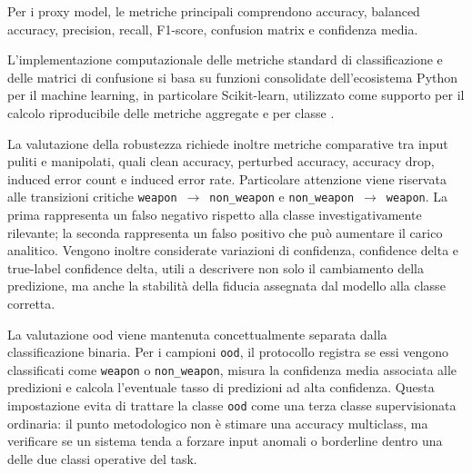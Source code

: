 Per i proxy model, le metriche principali comprendono accuracy, balanced
accuracy, precision, recall, F1-score, confusion matrix e confidenza media.

L'implementazione computazionale delle metriche standard di classificazione e
delle matrici di confusione si basa su funzioni consolidate dell'ecosistema
Python per il machine learning, in particolare Scikit-learn, utilizzato come
supporto per il calcolo riproducibile delle metriche aggregate e per classe
\cite{pedregosa2011scikit}.

La valutazione della robustezza richiede inoltre metriche comparative tra input
puliti e manipolati, quali clean accuracy, perturbed accuracy, accuracy drop,
induced error count e induced error rate. Particolare attenzione viene riservata
alle transizioni critiche \texttt{weapon}~$\rightarrow$~\texttt{non\_weapon} e
\texttt{non\_weapon}~$\rightarrow$~\texttt{weapon}. La prima rappresenta un
falso negativo rispetto alla classe investigativamente rilevante; la seconda
rappresenta un falso positivo che può aumentare il carico analitico. Vengono
inoltre considerate variazioni di confidenza, confidence delta e true-label
confidence delta, utili a descrivere non solo il cambiamento della predizione,
ma anche la stabilità della fiducia assegnata dal modello alla classe corretta.

La valutazione \gls{ood} viene mantenuta concettualmente separata dalla
classificazione binaria. Per i campioni \texttt{ood}, il protocollo registra se
essi vengono classificati come \texttt{weapon} o \texttt{non\_weapon}, misura la
confidenza media associata alle predizioni e calcola l'eventuale tasso di
predizioni ad alta confidenza. Questa impostazione evita di trattare la classe
\texttt{ood} come una terza classe supervisionata ordinaria: il punto
metodologico non è stimare una accuracy multiclass, ma verificare se un sistema
tenda a forzare input anomali o borderline dentro una delle due classi operative
del task.

